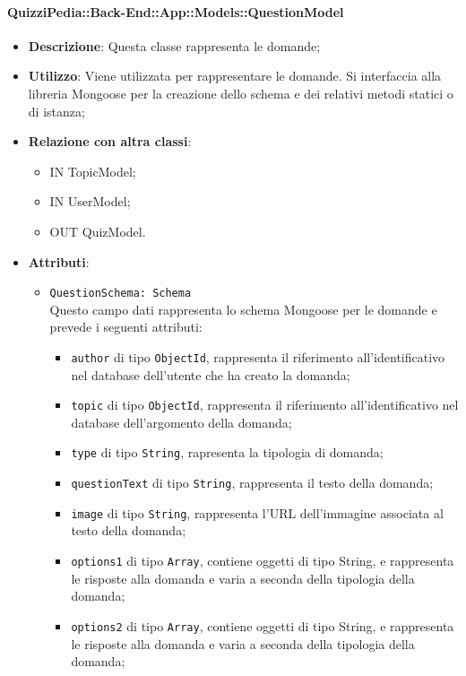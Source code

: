 \paragraph{QuizziPedia::Back-End::App::Models::QuestionModel}
\begin{itemize}
\item \textbf{Descrizione}: Questa classe rappresenta le domande;	
\item \textbf{Utilizzo}: Viene utilizzata per rappresentare le domande. Si interfaccia alla libreria Mongoose per la creazione dello schema e dei relativi metodi statici o di istanza;
\item \textbf{Relazione con altra classi}:
	\begin{itemize}
	\item IN TopicModel;
	\item IN UserModel;
	\item OUT QuizModel.
	\end{itemize}
\item \textbf{Attributi}:
	\begin{itemize}
	\item \texttt{QuestionSchema: Schema} \\
	Questo campo dati rappresenta lo schema Mongoose per le domande e prevede i 					seguenti attributi:
		\begin{itemize}
		\item \texttt{author} di tipo \texttt{ObjectId}, rappresenta il riferimento 					all'identificativo nel database dell'utente che ha creato la domanda;
		\item \texttt{topic} di tipo \texttt{ObjectId}, rappresenta il riferimento 					all'identificativo nel database dell'argomento della domanda;
		\item \texttt{type} di tipo \texttt{String}, rapresenta la tipologia di domanda;
		\item \texttt{questionText} di tipo \texttt{String}, rappresenta il testo della 				domanda; 
		\item \texttt{image} di tipo \texttt{String}, rappresenta l'URL dell'immagine 				associata al testo della domanda;
		\item \texttt{options1} di tipo \texttt{Array}, contiene oggetti di tipo String, e 		rappresenta le risposte alla domanda e varia a seconda della tipologia della 					domanda;
		\item \texttt{options2} di tipo \texttt{Array}, contiene oggetti di tipo String, e 		rappresenta le risposte alla domanda e varia a seconda della tipologia della 					domanda;

\end{itemize}
\end{itemize}
\end{itemize}
